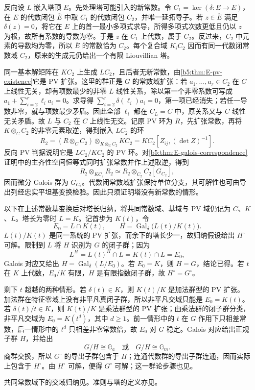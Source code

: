 \begin{proofsketch}
	反向设 \(L\) 嵌入塔顶 \(E\)。先处理塔可能引入的新常数。令 \(C_1=\ker(\delta:E\to E)\)，在 \(E\) 的代数闭包 \(\overline E\) 中取 \(C_1\) 的代数闭包 \(C_2\)，并唯一延拓导子。若 \(z\in\overline E\) 满足 \(\delta(z)=0\)，将它在 \(E\) 上的首一最小多项式求导，所得多项式次数更低且仍以 \(z\) 为根，故所有系数的导数为零。于是 \(z\) 在 \(C_1\) 上代数，属于 \(C_2\)。反过来，\(C_2\) 中元素的导数均为零，所以 \(\overline E\) 的常数恰为 \(C_2\)。每个复合域 \(K_iC_2\) 因而有同一代数闭常数域 \(C_2\)，原来的生成元仍给出一个有限 Liouvillian 塔。

	同一基本解矩阵在 \(KC_2\) 上生成 \(LC_2\)，且后者无新常数，由\cref{b5:thm:E-pv-existence}它是 PV 扩张。这里的群正是 \(G\) 的常数域扩张：若 \(a_1,\ldots,a_r\in C_2\) 在 \(C\) 上线性无关，却有项数最少的非零 \(L\) 线性关系，除以第一个非零系数可写成 \(a_1+\sum_{i=2}^r\ell_i a_i=0\)。求导得 \(\sum_{i=2}^r\delta(\ell_i)a_i=0\)，第一项已经消失；若任一导数非零，就与项数最少矛盾。因此全部 \(\ell_i\) 都在 \(C_L=C\) 中，原关系又与 \(C\) 线性无关矛盾。故 \(L\) 与 \(C_2\) 在 \(C\) 上线性无交。记原 PV 环为 \(R\)，先扩张常数，再将 \(K\otimes_C C_2\) 的非零元素取逆，得到嵌入 \(LC_2\) 的环
	\[
		R_2=(R\otimes_C C_2)\otimes_{K\otimes_C C_2}KC_2 =KC_2[Z_{ij},(\det Z)^{-1}].
	\]
	反向 PV 判据说明它是 \(LC_2/KC_2\) 的 PV 环。对\cref{b5:thm:E-galois-correspondence}证明中的主齐性空间恒等式同时扩张常数并作上述取逆，得到
	\[
		R_2\otimes_{KC_2}R_2 \simeq R_2\otimes_{C_2}C_2[G_{C_2}],
	\]
	因而微分 Galois 群为 \(G_{C_2}\)。代数闭常数域扩张保持单位分支，其可解性也可由导出列经忠实平坦基变换检验。因此只须证明塔没有新常数的情形。

	以下在上述常数基变换后对塔长归纳，将共同常数域、基域与 PV 域仍记为 \(C\)、\(K\)、\(L\)。塔长为零时 \(L=K\)。记首步为 \(K(t)\)，令
	\[
		E_0=L\cap K(t),\qquad H=\operatorname{Gal}_\delta\bigl(L(t)/K(t)\bigr).
	\]
	\(L(t)/K(t)\) 是同一系统的 PV 扩张，而余下的塔长少一，故归纳假设给出 \(H^\circ\) 可解。限制到 \(L\) 将 \(H\) 识别为 \(G\) 的闭子群；因为
	\[
		L^H=L(t)^H\cap L=K(t)\cap L=E_0,
	\]
	Galois 对应又给出 \(H=\operatorname{Gal}_\delta(L/E_0)\)。若 \(E_0=K\)，则 \(H=G\)，结论已得。若 \(t\) 在 \(K\) 上代数，\(E_0/K\) 有限，\(H\) 是有限指数闭子群，故 \(H^\circ=G^\circ\)。

	剩下 \(t\) 超越的两种情形。若 \(\delta(t)\in K\)，则 \(K(t)/K\) 是加法群型的 PV 扩张。加法群在特征零域上没有非平凡真闭子群，所以非平凡交域只能是 \(E_0=K(t)\)。若 \(\delta(t)/t\in K\)，则 \(K(t)/K\) 是乘法群型的 PV 扩张；由乘法群的闭子群分类，非平凡交域为 \(E_0=K(t^d)\)，其中 \(d\ge1\)。前一情形中的 \(t\) 在 \(G\) 作用下只相差常数，后一情形中的 \(t^d\) 只相差非零常数倍，故 \(E_0\) 对 \(G\) 稳定。Galois 对应给出正规子群 \(H\)，并给出
	\[
		G/H\cong\mathbb G_a\quad\text{或}\quad G/H\cong\mathbb G_m.
	\]
	商群交换，所以 \(G^\circ\) 的导出子群包含于 \(H\)；连通代数群的导出子群连通，因而实际上包含于 \(H^\circ\)。由 \(H^\circ\) 可解，便得 \(G^\circ\) 可解；这一群论步骤也见\cite[Corollary A.38]{VanDerPutSinger2003GaloisTheory}。

	共同常数域下的交域归纳见\cite[Section 1.5, Theorem 1.43]{VanDerPutSinger2003GaloisTheory}。准则与塔的定义亦见\cite[Definition 1.5.6 and Theorem 1.5.7, pp. 43--44]{Singer2009DifferentialGalois}。
\end{proofsketch}

